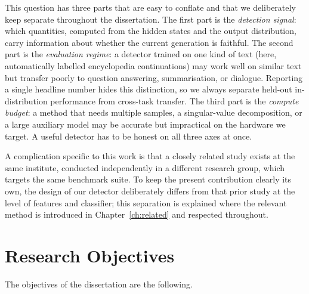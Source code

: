 This question has three parts that are easy to conflate and that we deliberately keep
separate throughout the dissertation. The first part is the \emph{detection signal}:
which quantities, computed from the hidden states and the output distribution, carry
information about whether the current generation is faithful. The second part is the
\emph{evaluation regime}: a detector trained on one kind of text (here, automatically
labelled encyclopedia continuations) may work well on similar text but transfer poorly
to question answering, summarisation, or dialogue. Reporting a single headline number
hides this distinction, so we always separate held-out in-distribution performance from
cross-task transfer. The third part is the \emph{compute budget}: a method that needs
multiple samples, a singular-value decomposition, or a large auxiliary model may be
accurate but impractical on the hardware we target. A useful detector has to be honest
on all three axes at once.

A complication specific to this work is that a closely related study exists at the same
institute, conducted independently in a different research group, which targets the same
benchmark suite. To keep the present contribution clearly its own, the design of our
detector deliberately differs from that prior study at the level of features and
classifier; this separation is explained where the relevant method is introduced in
Chapter~\ref{ch:related} and respected throughout.

\section{Research Objectives}

The objectives of the dissertation are the following.

